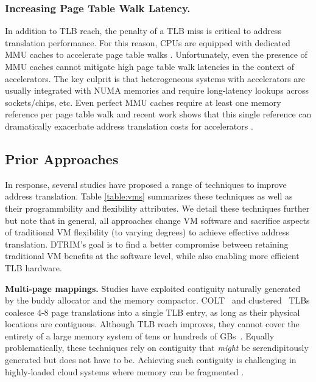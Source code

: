 \subsubsection{Increasing Page Table Walk Latency.} 
In addition to TLB reach, the penalty of a TLB miss is critical to
address translation performance. For this reason, CPUs are equipped
with dedicated MMU caches to accelerate page table walks
\cite{bhattacharjee:large-reach, barr:translation}. Unfortunately,
even the presence of MMU caches cannot mitigate high page table walk
latencies in the context of accelerators. The key culprit is that
heterogeneous systems with accelerators are usually integrated with
NUMA memories and require long-latency lookups across sockets/chips,
etc. Even perfect MMU caches require at least one memory reference per
page table walk and recent work shows that this single reference can
dramatically exacerbate address translation costs for accelerators
\cite{picorel:near-memory, pichai:architectural}.

\subsection{Prior Approaches}

In response, several studies have proposed a range of techniques to
improve address translation. Table \ref{table:vms} summarizes these
techniques as well as their programmbility and flexibility
attributes. We detail these techniques further but note that in
general, all approaches change VM software and sacrifice aspects of
traditional VM flexibility (to varying degrees) to achieve effective
address translation. DTRIM's goal is to find a better compromise
between retaining traditional VM benefits at the software level, while
also enabling more efficient TLB hardware.

\vspace{2mm}
\noindent\textbf{Multi-page mappings.} Studies have exploited
contiguity naturally generated by the buddy allocator and the memory
compactor. COLT~\cite{pham:colt} and clustered~\cite{pham:increasing}
TLBs coalesce 4-8 page translations into a single TLB entry, as long
as their physical locations are contiguous. Although TLB reach
improves, they cannot cover the entirety of a large memory system of
tens or hundreds of GBs~\cite{gandhi:range}.  Equally problematically,
these techniques rely on contiguity that {\it might} be
serendipitously generated but does not have to be. Achieving such
contiguity is challenging in highly-loaded cloud systems where memory
can be fragmented \cite{pham:colt}.

